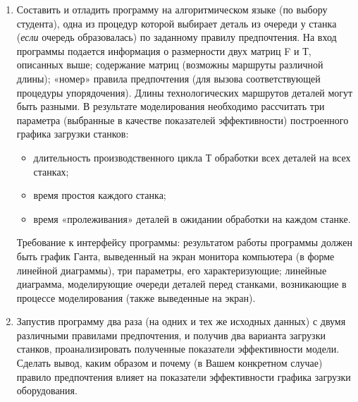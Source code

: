 \documentclass[a4paper,12pt]{article}
\begin{document}
\begin{flushleft}
\begin{enumerate}
\item
  Составить и отладить программу на алгоритмическом языке (по выбору
  студента), одна из процедур которой выбирает деталь из очереди у
  станка (\emph{если} очередь образовалась) по заданному правилу
  предпочтения. На вход программы подается информация о размерности двух
  матриц F и Т, описанных выше; содержание матриц (возможны маршруты
  различной длины); «номер» правила предпочтения (для вызова
  соответствующей процедуры упорядочения). Длины технологических
  маршрутов деталей могут быть разными. В результате моделирования
  необходимо рассчитать три параметра (выбранные в качестве показателей
  эффективности) построенного графика загрузки станков:

  \begin{itemize}
  \item
    длительность производственного цикла Т обработки всех деталей на всех
    станках;
  \item
    время простоя каждого станка;
  \item
    время «пролеживания» деталей в ожидании обработки на каждом станке. 
  \end{itemize}

  Требование к интерфейсу программы: результатом работы программы должен
  быть график Ганта, выведенный на экран монитора компьютера (в форме
  линейной диаграммы), три параметры, его характеризующие; линейные
  диаграмма, моделирующие очереди деталей перед станками, возникающие в
  процессе моделирования (также выведенные на экран).

\item
  Запустив программу два раза (на одних и тех же исходных данных) с
  двумя различными правилами предпочтения, и получив два варианта
  загрузки станков, проанализировать полученные показатели эффективности
  модели. Сделать вывод, каким образом и почему (в Вашем конкретном
  случае) правило предпочтения влияет на показатели эффективности
  графика загрузки оборудования. 
\end{enumerate}
\end{flushleft}

\pagebreak
\end{document}
